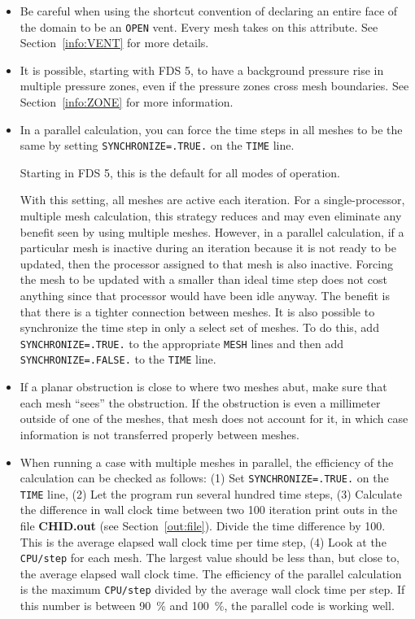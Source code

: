 \documentclass[11pt]{book}
\newcommand{\ct}{\tt\small}
\begin{document}
\begin{itemize}
\item Be careful when using the shortcut convention of declaring an
entire face of the domain to be an {\ct OPEN} vent. Every mesh
takes on this attribute. See Section~\ref{info:VENT} for more details.
\item It is possible, starting with FDS 5, to have a background pressure rise in multiple pressure zones,
even if the pressure zones cross mesh boundaries. See Section~\ref{info:ZONE} for more information.
\item In a parallel calculation, you can force the time steps in all meshes to
be the same by setting {\ct SYNCHRONIZE=.TRUE.} on the {\ct TIME} line.
\begin{warning}
\noindent
Starting in FDS 5, this is the default for all modes of operation.
\end{warning}
With this setting, all meshes are active each iteration.
For a single-processor, multiple mesh calculation, this strategy reduces
and may even eliminate any benefit seen by using multiple meshes. However, in a
parallel calculation, if a particular mesh is inactive during an iteration because
it is not ready to be updated, then the processor assigned to that mesh is also
inactive. Forcing the mesh to be updated with a smaller than ideal time step does not
cost anything since that processor would have been idle anyway. The benefit is that
there is a tighter connection between meshes.
It is also possible to synchronize the time step in only a select set of meshes. To do
this, add {\ct SYNCHRONIZE=.TRUE.} to the appropriate {\ct MESH} lines and then add
{\ct SYNCHRONIZE=.FALSE.} to the {\ct TIME} line.
\item If a planar obstruction is close to where two meshes abut, make sure that each
mesh ``sees'' the obstruction. If the obstruction is even a millimeter outside of one
of the meshes, that mesh does not account for it, in which case information is not
transferred properly between meshes.
\item When running a case with multiple meshes in parallel, the efficiency of the 
calculation can be checked as follows: (1) Set {\ct SYNCHRONIZE=.TRUE.} on the
{\ct TIME} line, (2) Let the program run several hundred time steps, (3) Calculate
the difference in wall clock time between two 100 iteration print outs in
the file {\bf CHID.out} (see Section~\ref{out:file}).
Divide the time difference by 100. This is the average
elapsed wall clock time per time step, (4) Look at the {\ct CPU/step} for each mesh. The
largest value should be less than, but close to, the average elapsed wall clock time.
The efficiency of the parallel calculation is the maximum {\ct CPU/step} divided by
the average wall clock time per step. If this number is between 90~\% and 100~\%, the
parallel code is working well.
\end{itemize}
\end{document}
